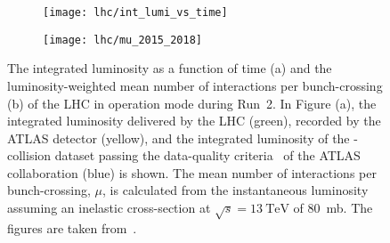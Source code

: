 \begin{figure}[htbp]
  \centering

  \begin{subfigure}{0.47\textwidth}
    \texttt{[image: lhc/int\_lumi\_vs\_time]}
    \subcaption{}%
    \label{fig:atlas_int_lumi_vs_time}
  \end{subfigure}\hspace*{0.02\textwidth}%
  \begin{subfigure}{0.47\textwidth}
    \texttt{[image: lhc/mu\_2015\_2018]}
    \subcaption{}%
    \label{fig:atlas_mu}
  \end{subfigure}

  \caption{The integrated luminosity as a function of time (a) and the
    luminosity-weighted mean number of interactions per bunch-crossing (b) of
    the LHC in \pp operation mode during Run~2. In Figure (a), the integrated
    luminosity delivered by the LHC (green), recorded by the ATLAS detector
    (yellow), and the integrated luminosity of the \pp-collision dataset passing
    the data-quality criteria~\cite{DAPR-2018-01} of the ATLAS collaboration
    (blue) is shown. The mean number of interactions per bunch-crossing, $\mu$,
    is calculated from the instantaneous luminosity assuming an inelastic \pp
    cross-section at $\sqrt{s} = \SI{13}{\TeV}$ of \SI{80}{\milli\barn}. The
    figures are taken from~\cite{atlas_luminosity_summary_plots}.}%
  \label{fig:lumi_and_pu}
\end{figure}


